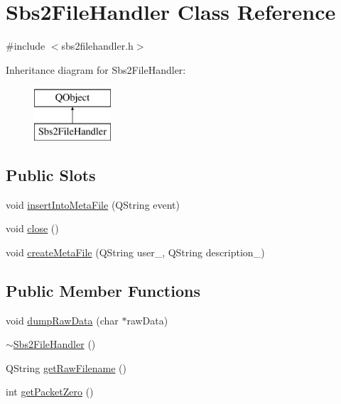 \hypertarget{classSbs2FileHandler}{\section{Sbs2\-File\-Handler Class Reference}
\label{classSbs2FileHandler}
}


{\ttfamily \#include $<$sbs2filehandler.\-h$>$}

Inheritance diagram for Sbs2\-File\-Handler\-:\begin{figure}[H]
\begin{center}
\leavevmode
\includegraphics[height=2.000000cm]{classSbs2FileHandler}
\end{center}
\end{figure}
\subsection*{Public Slots}
\begin{DoxyCompactItemize}
\item 
void \hyperlink{classSbs2FileHandler_a2b5bc147768ba76d694045fc8163a07f}{insert\-Into\-Meta\-File} (Q\-String event)
\item 
void \hyperlink{classSbs2FileHandler_a981682a2485188e1aeea82d87d58844e}{close} ()
\item 
void \hyperlink{classSbs2FileHandler_a129918680fb23627ee734402bc6382fa}{create\-Meta\-File} (Q\-String user\-\_\-, Q\-String description\-\_\-)
\end{DoxyCompactItemize}
\subsection*{Public Member Functions}
\begin{DoxyCompactItemize}
\item 
void \hyperlink{classSbs2FileHandler_a4a2767712909e5437bbb9d1a81ba88b2}{dump\-Raw\-Data} (char $\ast$raw\-Data)
\item 
\hyperlink{classSbs2FileHandler_a311041e7ee81403d0371f1d95f223979}{$\sim$\-Sbs2\-File\-Handler} ()
\item 
Q\-String \hyperlink{classSbs2FileHandler_aa1636922d6cf30c6efece6eb8114d14c}{get\-Raw\-Filename} ()
\item 
int \hyperlink{classSbs2FileHandler_adaa22c27c0fdd391478e437e88781b51}{get\-Packet\-Zero} ()
\end{DoxyCompactItemize}
